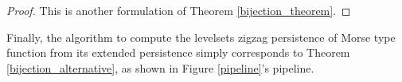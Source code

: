 \documentclass[11pt]{article}
\theoremstyle{remark}
\begin{document}
\begin{proof}
This is another formulation of Theorem \ref{bijection_theorem}.
\end{proof}

\noindent Finally, the algorithm to compute the levelsets zigzag persistence of Morse type function from its extended persistence simply corresponds to  Theorem \ref{bijection_alternative}, as shown in Figure \ref{pipeline}'s pipeline.\\


\begin{figure}
    \centering
    












\begin{tikzpicture}[x=0.60pt,y=0.60pt,yscale=-1,xscale=1]


\end{tikzpicture}
\end{figure}
\end{document}
